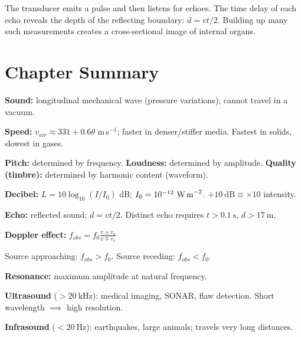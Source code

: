 \begin{diagbox}
\begin{center}
\begin{tikzpicture}[scale=0.95, font=\small]
\end{tikzpicture}
\end{center}
\small The transducer emits a pulse and then listens
for echoes. The time delay of each echo reveals the
depth of the reflecting boundary: $d = vt/2$. Building
up many such measurements creates a cross-sectional
image of internal organs.
\end{diagbox}

\section{Chapter Summary}

\begin{summarybox}
\textbf{Sound:} longitudinal mechanical wave (pressure
variations); cannot travel in a vacuum.

\textbf{Speed:} $v_{air} \approx 331 + 0.6\theta$
m\,s$^{-1}$; faster in denser/stiffer media.
Fastest in solids, slowest in gases.

\textbf{Pitch:} determined by frequency.
\textbf{Loudness:} determined by amplitude.
\textbf{Quality (timbre):} determined by harmonic
content (waveform).

\textbf{Decibel:} $L = 10\log_{10}(I/I_0)$ dB;
$I_0 = 10^{-12}\ \text{W\,m}^{-2}$.
$+10\ \text{dB} \equiv \times 10$ intensity.

\textbf{Echo:} reflected sound; $d = vt/2$.
Distinct echo requires $t > 0.1\ \text{s}$,
$d > 17\ \text{m}$.

\textbf{Doppler effect:}
$f_{obs} = f_0 \frac{v \pm v_o}{v \mp v_s}$

Source approaching: $f_{obs} > f_0$.
Source receding: $f_{obs} < f_0$.

\textbf{Resonance:} maximum amplitude at natural
frequency.

\textbf{Ultrasound} ($>20\ \text{kHz}$): medical
imaging, SONAR, flaw detection.
Short wavelength $\implies$ high resolution.

\textbf{Infrasound} ($<20\ \text{Hz}$): earthquakes,
large animals; travels very long distances.
\end{summarybox}

